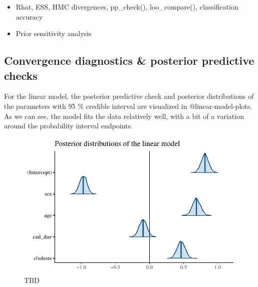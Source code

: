 \documentclass[
  letterpaper,
  DIV=11,
  numbers=noendperiod]{scrartcl}
\providecommand{\tightlist}{%
  \setlength{\itemsep}{0pt}\setlength{\parskip}{0pt}}\usepackage{longtable,booktabs,array}
\begin{document}
\begin{itemize}
\tightlist
\item
  Rhat, ESS, HMC divergences, pp\_check(), loo\_compare(),
  classification accuracy
\item
  Prior sensitivity analysis
\end{itemize}

\hypertarget{convergence-diagnostics-posterior-predictive-checks}{%
\subsection{Convergence diagnostics \& posterior predictive
checks}\label{convergence-diagnostics-posterior-predictive-checks}}

For the linear model, the posterior predictive check and posterior
distributions of the parameters with 95 \% credible interval are
visualized in @linear-model-plots. As we can see, the model fits the
data relatively well, with a bit of a variation around the probability
interval endpoints.

\begin{figure}

{\centering \includegraphics{project_final_files/figure-pdf/linear-model-pp-check-1.pdf}

}

\caption{TBD}

\end{figure}
\end{document}
